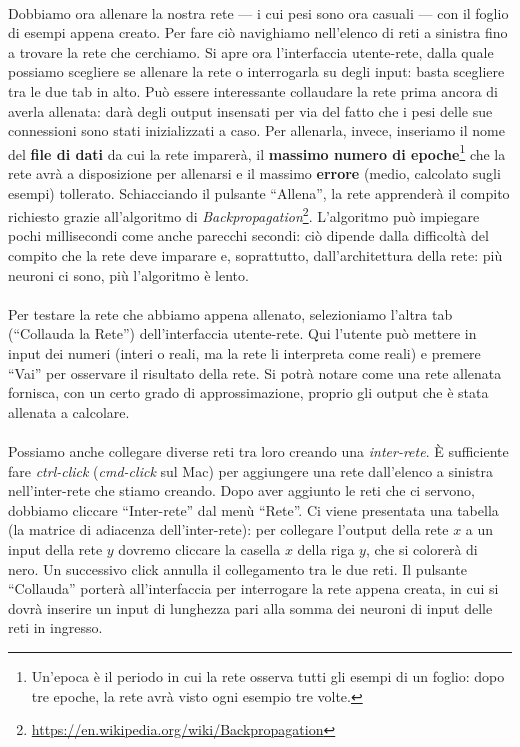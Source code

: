 \documentclass{article}
\begin{document}
\paragraph{} Dobbiamo ora allenare la nostra rete --- i cui pesi sono ora casuali --- con il foglio di esempi appena creato. Per fare ciò navighiamo nell'elenco di reti a sinistra fino a trovare la rete che cerchiamo. Si apre ora l'interfaccia utente-rete, dalla quale possiamo scegliere se allenare la rete o interrogarla su degli input: basta scegliere tra le due tab in alto. Può essere interessante collaudare la rete prima ancora di averla allenata: darà degli output insensati per via del fatto che i pesi delle sue connessioni sono stati inizializzati a caso. Per allenarla, invece, inseriamo il nome del \textbf{file di dati} da cui la rete imparerà, il \textbf{massimo numero di epoche}\footnote{Un'epoca è il periodo in cui la rete osserva tutti gli esempi di un foglio: dopo tre epoche, la rete avrà visto ogni esempio tre volte.} che la rete avrà a disposizione per allenarsi e il massimo \textbf{errore} (medio, calcolato sugli esempi) tollerato. Schiacciando il pulsante “Allena”, la rete apprenderà il compito richiesto grazie all'algoritmo di \emph{Backpropagation}\footnote{\url{https://en.wikipedia.org/wiki/Backpropagation}}. L'algoritmo può impiegare pochi millisecondi come anche parecchi secondi: ciò dipende dalla difficoltà del compito che la rete deve imparare e, soprattutto, dall'architettura della rete: più neuroni ci sono, più l'algoritmo è lento.

\paragraph{} Per testare la rete che abbiamo appena allenato, selezioniamo l'altra tab (“Collauda la Rete”) dell'interfaccia utente-rete. Qui l'utente può mettere in input dei numeri (interi o reali, ma la rete li interpreta come reali) e premere “Vai” per osservare il risultato della rete. Si potrà notare come una rete allenata fornisca, con un certo grado di approssimazione, proprio gli output che è stata allenata a calcolare.

\paragraph{} Possiamo anche collegare diverse reti tra loro creando una \emph{inter-rete}. È sufficiente fare \emph{ctrl-click} (\emph{cmd-click} sul Mac) per aggiungere una rete dall'elenco a sinistra nell'inter-rete che stiamo creando. Dopo aver aggiunto le reti che ci servono, dobbiamo cliccare “Inter-rete” dal menù “Rete”. Ci viene presentata una tabella (la matrice di adiacenza dell'inter-rete): per collegare l'output della rete $x$ a un input della rete $y$ dovremo cliccare la casella $x$ della riga $y$, che si colorerà di nero. Un successivo click annulla il collegamento tra le due reti. Il pulsante “Collauda” porterà all'interfaccia per interrogare la rete appena creata, in cui si dovrà inserire un input di lunghezza pari alla somma dei neuroni di input delle reti in ingresso.
\end{document}
